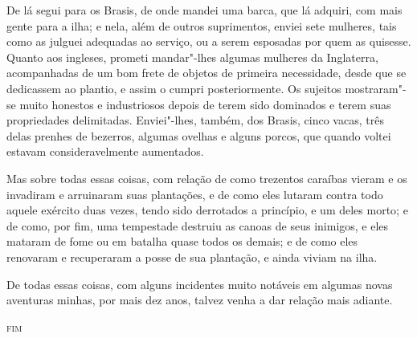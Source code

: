 De lá segui para os Brasis, de onde mandei uma barca, que lá adquiri,
com mais gente para a ilha; e nela, além de outros suprimentos, enviei
sete mulheres, tais como as julguei adequadas ao serviço, ou a serem
esposadas por quem as quisesse. Quanto aos ingleses, prometi mandar"-lhes
algumas mulheres da Inglaterra, acompanhadas de um bom frete de objetos
de primeira necessidade, desde que se dedicassem ao plantio, e assim o
cumpri posteriormente. Os sujeitos mostraram"-se muito honestos e
industriosos depois de terem sido dominados e terem suas propriedades
delimitadas. Enviei"-lhes, também, dos Brasis, cinco vacas, três delas
prenhes de bezerros, algumas ovelhas e alguns porcos, que quando voltei
estavam consideravelmente aumentados.

Mas sobre todas essas coisas, com relação de como trezentos caraíbas
vieram e os invadiram e arruinaram suas plantações, e de como eles
lutaram contra todo aquele exército duas vezes, tendo sido derrotados a
princípio, e um deles morto; e de como, por fim, uma tempestade destruiu
as canoas de seus inimigos, e eles mataram de fome ou em batalha quase
todos os demais; e de como eles renovaram e recuperaram a posse de sua
plantação, e ainda viviam na ilha.

De todas essas coisas, com alguns incidentes muito notáveis em algumas
novas aventuras minhas, por mais dez anos, talvez venha a dar relação
mais adiante.

\bigskip
\bigskip

\begin{center}
\textsc{fim}
\end{center}